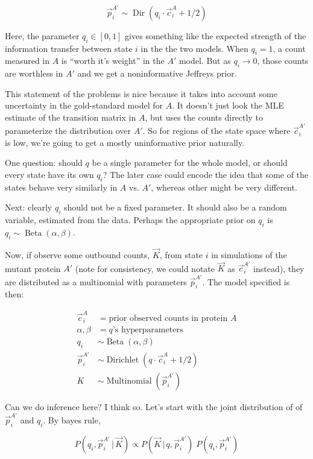 \documentclass[twocolumn,floatfix,nofootinbib,aps]{revtex4-1}
\renewcommand{\vert}{\, | \,}
\begin{document}
$$
\vec{p}_i^{A'} \sim \operatorname{Dir}(q_i \cdot \vec{c}_i^A + 1/2)
$$

Here, the parameter $q_i \in [0,1]$ gives something like the expected strength of the information transfer between state $i$ in the the two models. When $q_i=1$, a count measured in $A$ is ``worth it's weight'' in the $A'$ model. But as $q_i \rightarrow 0$, those counts are worthless in $A'$ and we get a noninformative Jeffreys prior.

This statement of the problems is nice because it takes into account some uncertainty in the gold-standard model for $A$. It doesn't just look the MLE estimate of the transition matrix in $A$, but uses the counts directly to parameterize the distribution over $A'$. So for regions of the state space where $\vec{c}_i^{A'}$ is low, we're going to get a mostly uninformative prior naturally.

One question: should $q$ be a single parameter for the whole model, or should every state have its own $q_i$? The later case could encode the idea that some of the states behave very similarly in $A$ vs. $A'$, whereas other might be very different.

Next: clearly $q_i$ should not be a fixed parameter. It should also be a random variable, estimated from the data. Perhaps the appropriate prior on $q_i$ is $q_i \sim \operatorname{Beta}(\alpha, \beta)$.

Now, if observe some outbound counts, $\vec{K}$, from state $i$ in simulations of the mutant protein $A'$ (note for consistency, we could notate $\vec{K}$ as $\vec{c}_i^{A'}$ instead), they are distributed as a multinomial with parameters $\vec{p}_i^{A'}$. The model specified is then:
 
\begin{align*}
    \vec{c}_i^A &= \text{prior observed counts in protein $A$}\\
    \alpha, \beta &= \text{$q$'s hyperparameters}\\
    q_i &\sim \operatorname{Beta}(\alpha, \beta) \\
    \vec{p}_i^{A'} &\sim \operatorname{Dirichlet}(q \cdot \vec{c}_i^A + 1/2)\\
    K &\sim \operatorname{Multinomial}(\vec{p}_i^{A'})
\end{align*}

Can we do inference here? I think so. Let's start with the joint distribution of of $\vec{p}_i^{A'}$ and $q_i$. By bayes rule,

$$
P(q_i, \vec{p}_i^{A'} \vert \vec{K}) \propto P(\vec{K} \vert q, \vec{p}_i^{A'}) \;  P(q_i, \vec{p}_i^{A'})
$$
\end{document}
